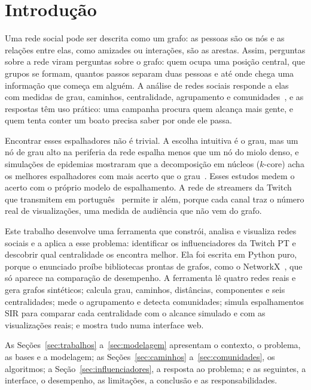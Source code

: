\section{Introdução}\label{sec:introducao}

Uma rede social pode ser descrita como um grafo: as pessoas são os nós e as relações entre elas,
como amizades ou interações, são as arestas. Assim, perguntas sobre a rede viram perguntas sobre o
grafo: quem ocupa uma posição central, que grupos se formam, quantos passos separam duas pessoas e
até onde chega uma informação que começa em alguém. A análise de redes sociais responde a elas com
medidas de grau, caminhos, centralidade, agrupamento e comunidades~\cite{wasserman1994,newman2018},
e as respostas têm uso prático: uma campanha procura quem alcança mais gente, e quem tenta conter
um boato precisa saber por onde ele passa.

Encontrar esses espalhadores não é trivial. A escolha intuitiva é o grau, mas um nó de grau alto
na periferia da rede espalha menos que um nó do miolo denso, e simulações de epidemias mostraram
que a decomposição em núcleos ($k$-core) acha os melhores espalhadores com mais acerto que o
grau~\cite{kitsak2010}. Esses estudos medem o acerto com o próprio modelo de espalhamento. A rede
de streamers da Twitch que transmitem em português~\cite{rozemberczki2021} permite ir além, porque
cada canal traz o número real de visualizações, uma medida de audiência que não vem do grafo.

Este trabalho desenvolve uma ferramenta que constrói, analisa e visualiza redes sociais e a aplica
a esse problema: identificar os influenciadores da Twitch PT e descobrir qual centralidade os
encontra melhor. Ela foi escrita em Python puro, porque o enunciado proíbe bibliotecas prontas de
grafos, como o NetworkX~\cite{hagberg2008}, que só aparece na comparação de desempenho. A
ferramenta lê quatro redes reais e gera grafos sintéticos; calcula grau, caminhos, distâncias,
componentes e seis centralidades; mede o agrupamento e detecta comunidades; simula espalhamentos
SIR para comparar cada centralidade com o alcance simulado e com as visualizações reais; e mostra
tudo numa interface web.

As Seções~\ref{sec:trabalhos} a~\ref{sec:modelagem} apresentam o contexto, o problema, as bases e a
modelagem; as Seções~\ref{sec:caminhos} a~\ref{sec:comunidades}, os algoritmos; a
Seção~\ref{sec:influenciadores}, a resposta ao problema; e as seguintes, a interface, o desempenho,
as limitações, a conclusão e as responsabilidades.
